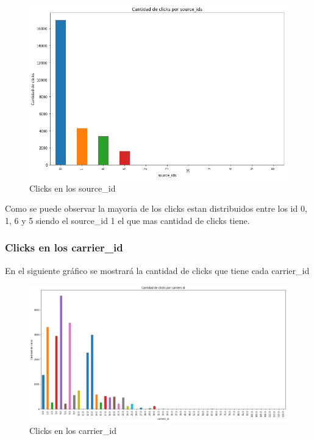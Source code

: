 \documentclass[a4paper, 12pt]{article}
\newcommand\tab[1][1cm]{\hspace*{#1}}
\begin{document}
		
		\FloatBarrier
		\begin{figure}[h]
			\centering
			\includegraphics[width=\textwidth]{images/clicks/clicks_source_id.png}
			\caption{Clicks en los source\_id}
		\end{figure}
		\FloatBarrier

		\tab Como se puede observar la mayoria de los clicks estan distribuidos entre los id 0, 1, 6 y 5 siendo el source\_id 1 el que mas cantidad de clicks tiene.


	\subsubsection{Clicks en los carrier\_id}
		\tab En el siguiente gráfico se mostrará la cantidad de clicks que tiene cada carrier\_id
		
		\FloatBarrier
		\begin{figure}[h]
			\centering
			\includegraphics[width=\textwidth]{images/clicks/clicks_carrier_id.png}
			\caption{Clicks en los carrier\_id}
		\end{figure}
		\FloatBarrier
\end{document}
